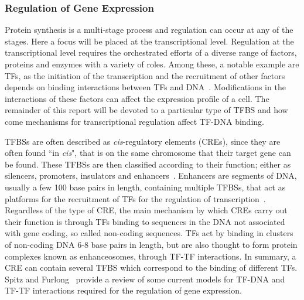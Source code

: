        
        \subsubsection{Regulation of Gene Expression}
        
        Protein synthesis is a multi-stage process and regulation can occur at any of the stages. Here a focus will be placed at the transcriptional level.
        Regulation at the transcriptional level requires the orchestrated efforts of a diverse range of factors, proteins and enzymes with a variety of roles. Among these, a notable example are TFs, as the initiation of the transcription and the recruitment of other factors depends on binding interactions between TFs and DNA~\cite{lemon2000orchestrated}. Modifications in the interactions of these factors can affect the expression profile of a cell. The remainder of this report will be devoted to a particular type of TFBS and how come mechanisms for transcriptional regulation affect TF-DNA binding. 
        
        
        TFBSs are often described as \emph{cis}-regulatory elements (CREs), since they are often found ``in \emph{cis}", that is on the same chromosome that their target gene can be found. These TFBSs are then classified according to their function; either as silencers, promoters, insulators and enhancers~\cite{gaszner2006insulators, gross1988nuclease, li1999locus}. Enhancers are segments of DNA, usually a few 100 base pairs in length,  containing multiple TFBSs, that act as platforms for the recruitment of TFs for the regulation of transcription~\cite{spitz2012transcription}. 
        Regardless of the type of CRE, the main mechanism by which CREs carry out their function is through TFs binding to sequences in the DNA not associated with gene coding, so called non-coding sequences. 
        TFs act by binding in clusters of non-coding DNA 6-8 base pairs in length, but are also thought to form protein complexes known as enhanceosomes, through TF-TF interactions. In summary, a CRE can contain several TFBS which correspond to the binding of different TFs. Spitz and Furlong~\cite{spitz2012transcription} provide a review of some current models for TF-DNA and TF-TF interactions required for the regulation of gene expression.
        
